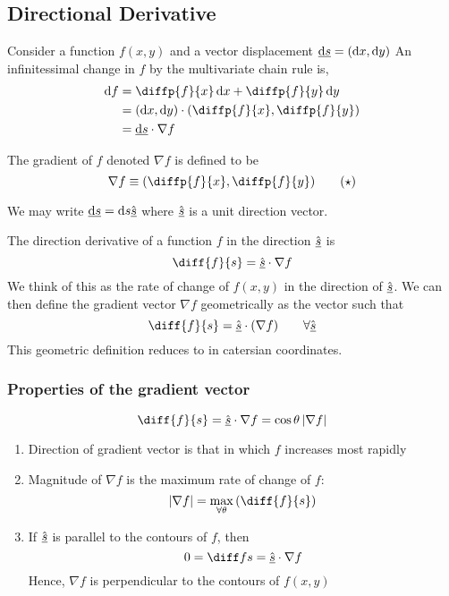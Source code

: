 \documentclass{article}
\begin{document}
\subsection{Directional Derivative}
Consider a function $f(x, y)$ and a vector displacement $\underline{\mathop{}\!\mathrm{d} s} = (\mathop{}\!\mathrm{d} x, \mathop{}\!\mathrm{d} y)$
An infinitessimal change in $f$ by the multivariate chain rule is,
\begin{align*}
    \diffd f &= \diffp{f}{x} \diffd x + \diffp{f}{y} \diffd y \\
    &= (\diffd x, \diffd y) \cdot (\diffp{f}{x}, \diffp{f}{y}) \\
    &= \vec{\diffd s} \cdot \nabla f
\end{align*}

\begin{defi}[Gradient of $f$]
    The gradient of $f$ denoted $\nabla f$ is defined to be
    \[
        \nabla f \equiv (\diffp{f}{x}, \diffp{f}{y}) \tagstar
    \]
\end{defi}
We may write $\underline{\mathop{}\!\mathrm{d} s} = \mathop{}\!\mathrm{d} s \hat{\underline{s}}$ where $\hat{\underline{s}}$ is a unit direction vector.

\begin{defi}
    The direction derivative of a function $f$ in the direction $\hat{\underline{s}}$ is
    \[
        \diff{f}{s} = \uvec s \cdot \nabla f  
    \]
    We think of this as the rate of change of $f(x, y)$ in the direction of $\hat{\underline{s}}$.
    We can then define the gradient vector $\nabla f$ geometrically as the vector such that
    \[
        \diff{f}{s} = \uvec s \cdot (\nabla f) \qquad \forall \uvec s  
    \]
    This geometric definition reduces to  in catersian coordinates.
\end{defi}
\subsubsection*{Properties of the gradient vector}
\[
    \diff{f}{s} = \uvec s \cdot \nabla f = \cos \theta \abs{\nabla f}  
\]
\begin{enumerate}
    \item Direction of gradient vector is that in which $f$ increases most rapidly
    \item Magnitude of $\nabla f$ is the maximum rate of change of $f$:
    \[
        \abs{\nabla f} = \max_{\forall \theta} \bkt{\diff{f}{s}}  
    \]
    \item If $\hat{\underline{s}}$ is parallel to the contours of $f$, then
    \[
        0 = \diff fs = \uvec s \cdot \nabla f  
    \]
    Hence, $\nabla f$ is perpendicular to the contours of $f(x, y)$
\end{enumerate}
\end{document}
